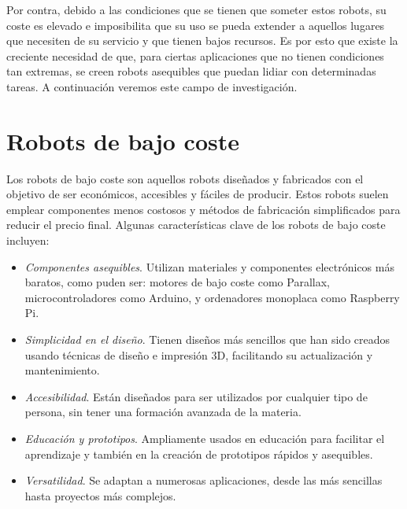 \setcounter{footnote}{18} %
\setcounter{footnote}{19} %
\setcounter{footnote}{20} %

Por contra, debido a las condiciones que se tienen que someter estos robots, su coste es elevado e imposibilita que su uso se pueda extender a aquellos lugares que necesiten de su servicio y que tienen bajos recursos. Es por esto que existe la creciente necesidad de que, para ciertas aplicaciones que no tienen condiciones tan extremas, se creen robots asequibles que puedan lidiar con determinadas tareas. A continuación veremos este campo de investigación. 

\section{Robots de bajo coste}

Los robots de bajo coste son aquellos robots diseñados y fabricados con el objetivo de ser económicos, accesibles y fáciles de producir. Estos robots suelen emplear componentes menos costosos y métodos de fabricación simplificados para reducir el precio final. Algunas características clave de los robots de bajo coste incluyen:

\begin{itemize}
	\item \textit{Componentes asequibles}. Utilizan materiales y componentes electrónicos más baratos, como puden ser: motores de bajo coste como Parallax, microcontroladores como Arduino, y ordenadores monoplaca como Raspberry Pi.
	\item \textit{Simplicidad en el diseño}. Tienen diseños más sencillos que han sido creados usando técnicas de diseño e impresión 3D, facilitando su actualización y mantenimiento.
	\item \textit{Accesibilidad}. Están diseñados para ser utilizados por cualquier tipo de persona, sin tener una formación avanzada de la materia.
	\item \textit{Educación y prototipos}. Ampliamente usados en educación para facilitar el aprendizaje y también en la creación de prototipos rápidos y asequibles.
	\item \textit{Versatilidad}. Se adaptan a numerosas aplicaciones, desde las más sencillas hasta proyectos más complejos.
	
\end{itemize}\



